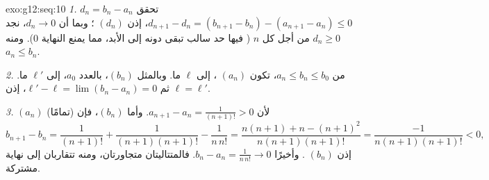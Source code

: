 \begin{solution}{exo:g12:seq:10}
\emph{1.}  $d_n = b_n - a_n$ تحقق
$d_{n+1} - d_n = (b_{n+1} - b_n) - (a_{n+1} - a_n) \leq 0$، إذن $(d_n)$
؛ وبما أن $d_n \to 0$، نجد $d_n \geq 0$ من أجل كل $n$ (
 فيها حد سالب تبقى دونه إلى الأبد، مما يمنع
النهاية $0$). ومنه $a_n \leq b_n$.

\emph{2.} من $a_n \leq b_n \leq b_0$، تكون   $(a_n)$
،  إلى $\ell$ ما. وبالمثل  $(b_n)$، 
 بالعدد $a_0$، إلى $\ell'$ ما. ثم
$\ell' - \ell = \lim (b_n - a_n) = 0$، إذن $\ell = \ell'$.

\emph{3.}  $(a_n)$  (تمامًا) لأن
$a_{n+1} - a_n = \frac{1}{(n+1)!} > 0$. وأما $(b_n)$، فإن
\[
b_{n+1} - b_n = \frac{1}{(n+1)!} + \frac{1}{(n+1)(n+1)!} - \frac{1}{n\,n!}
= \frac{n(n+1) + n - (n+1)^2}{n(n+1)(n+1)!}
= \frac{-1}{n(n+1)(n+1)!} < 0 ,
\]
إذن $(b_n)$ . وأخيرًا $b_n - a_n = \frac{1}{n\,n!} \to 0$. فالمتتاليتان
متجاورتان، ومنه تتقاربان إلى نهاية مشتركة.
\end{solution}

